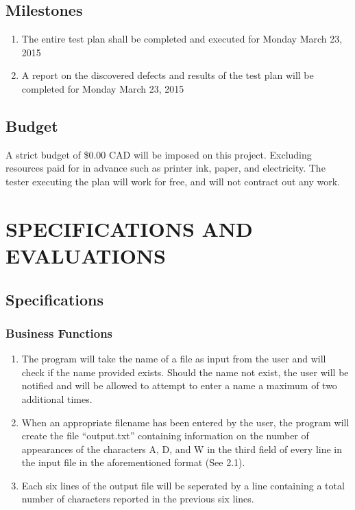 \documentclass[]{article}
\begin{document}
\subsection{Milestones}
\label{sub:user_characteristics}
\begin{enumerate}[1)]
	\item The entire test plan shall be completed and executed for Monday March 23,
	2015
	\item A report on the discovered defects and results of the test plan will be
	completed for Monday March 23, 2015
\end{enumerate}

\subsection{Budget}
\label{sub:constraints}
	A strict budget of \$0.00 CAD will be imposed on this project.  Excluding
	resources paid for in advance such as printer ink, paper, and electricity.  The
	tester executing the plan will work for free, and will not contract out any
	work.


\section{SPECIFICATIONS AND EVALUATIONS}
\label{sec:functional_requirements}

\subsection{Specifications}
\label{sub:user_characteristics}

\subsubsection{Business Functions}
\label{sub:user_characteristics}
\begin{enumerate}
  \item The program will take the name of a file as input from the user and will
  check if the name provided exists.  Should the name not exist, the user will
  be notified and will be allowed to attempt to enter a name a maximum of two
  additional times.
  \item When an appropriate filename has been entered by the user, the program
  will create the file ``output.txt'' containing information on the number of
  appearances of the characters A, D, and W in the third field of every line in
  the input file in the aforementioned format (See 2.1).
  \item Each six lines of the output file will be seperated by a line
  containing a total number of characters reported in the previous six lines.
\end{enumerate}
\end{document}
